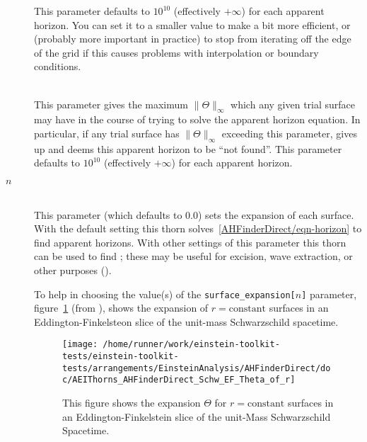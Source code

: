 \begin{description}
	This parameter defaults to $10^{10}$ (effectively $+\infty$)
	for each apparent horizon.  You can set it to a smaller value
	to make  a bit more efficient, or
	(probably more important in practice) to stop
	 from iterating off the edge of the grid
	if this causes problems with interpolation or boundary conditions.

\item[\code{max\_allowable\_Theta}]
\mbox{}\\
	This parameter gives the maximum $\|\Theta\|_\infty$
	which any given trial surface may have in the course of
	trying to solve the apparent horizon equation.
	In particular, if any trial surface has $\|\Theta\|_\infty$
	exceeding this parameter,  gives up
	and deems this apparent horizon to be ``not found''.
	This parameter defaults to $10^{10}$ (effectively $+\infty$)
	for each apparent horizon.

\item[\code{surface\_expansion[}$n$\code{]}]
\mbox{}\\
	This parameter (which defaults to 0.0) sets the expansion
	of each surface.  With the default setting this thorn
	solves~\eqref{AHFinderDirect/eqn-horizon} to find apparent
	horizons.  With other settings of this parameter this thorn
	can be used to find ;
	these may be useful for excision, wave extraction, or
	other purposes (\cite{AHFinderDirect/Schnetter03a}).

	To help in choosing the value(s) of the
	\verb|surface_expansion[|$n$\verb|]| parameter,
	figure~\ref{AHFinderDirect/fig-Schwarzschild-EF-Theta(r)}
	(from \cite{AHFinderDirect/Thornburg95}),
	shows the expansion of $r = \text{constant}$ surfaces
	in an Eddington-Finkelsteon slice of the unit-mass
	Schwarzschild spacetime.

\begin{figure}[htbp]
\begin{center}
\texttt{[image: /home/runner/work/einstein-toolkit-tests/einstein-toolkit-tests/arrangements/EinsteinAnalysis/AHFinderDirect/doc/AEIThorns\_AHFinderDirect\_Schw\_EF\_Theta\_of\_r]}
\end{center}
\caption[Expansion $\Theta$ for $r = \text{constant}$ Surfaces
	 in an Eddington-Finkelstein slice
	 of the Unit-Mass Schwarzschild Spacetime]
	{
	This figure shows the expansion $\Theta$ for $r = \text{constant}$
	surfaces in an Eddington-Finkelstein slice of the unit-Mass
	Schwarzschild Spacetime.
	}
\label{AHFinderDirect/fig-Schwarzschild-EF-Theta(r)}
\end{figure}

\end{description}

